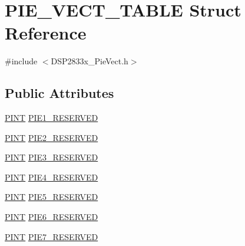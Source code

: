 \hypertarget{struct_p_i_e___v_e_c_t___t_a_b_l_e}{}\section{P\+I\+E\+\_\+\+V\+E\+C\+T\+\_\+\+T\+A\+B\+L\+E Struct Reference}
\label{struct_p_i_e___v_e_c_t___t_a_b_l_e}


{\ttfamily \#include $<$D\+S\+P2833x\+\_\+\+Pie\+Vect.\+h$>$}

\subsection*{Public Attributes}
\begin{DoxyCompactItemize}
\item 
\hyperlink{_d_s_p2833x___pie_vect_8h_ac2d9a96f68c695b560ad7d1322ad84b5}{P\+I\+N\+T} \hyperlink{struct_p_i_e___v_e_c_t___t_a_b_l_e_a99d8f42061323e647c8bbf95e43742e3}{P\+I\+E1\+\_\+\+R\+E\+S\+E\+R\+V\+E\+D}
\item 
\hyperlink{_d_s_p2833x___pie_vect_8h_ac2d9a96f68c695b560ad7d1322ad84b5}{P\+I\+N\+T} \hyperlink{struct_p_i_e___v_e_c_t___t_a_b_l_e_ac9575229b1b7ab91cfded48edbdf9b97}{P\+I\+E2\+\_\+\+R\+E\+S\+E\+R\+V\+E\+D}
\item 
\hyperlink{_d_s_p2833x___pie_vect_8h_ac2d9a96f68c695b560ad7d1322ad84b5}{P\+I\+N\+T} \hyperlink{struct_p_i_e___v_e_c_t___t_a_b_l_e_a432e44f671a793ae755c483f9f969168}{P\+I\+E3\+\_\+\+R\+E\+S\+E\+R\+V\+E\+D}
\item 
\hyperlink{_d_s_p2833x___pie_vect_8h_ac2d9a96f68c695b560ad7d1322ad84b5}{P\+I\+N\+T} \hyperlink{struct_p_i_e___v_e_c_t___t_a_b_l_e_a904cf1b50410fd849c9967f4c542cf88}{P\+I\+E4\+\_\+\+R\+E\+S\+E\+R\+V\+E\+D}
\item 
\hyperlink{_d_s_p2833x___pie_vect_8h_ac2d9a96f68c695b560ad7d1322ad84b5}{P\+I\+N\+T} \hyperlink{struct_p_i_e___v_e_c_t___t_a_b_l_e_a262c9f6963dfc62b00c3584c85694fbb}{P\+I\+E5\+\_\+\+R\+E\+S\+E\+R\+V\+E\+D}
\item 
\hyperlink{_d_s_p2833x___pie_vect_8h_ac2d9a96f68c695b560ad7d1322ad84b5}{P\+I\+N\+T} \hyperlink{struct_p_i_e___v_e_c_t___t_a_b_l_e_aa8dbfbadedced057110de3bcb203c6e3}{P\+I\+E6\+\_\+\+R\+E\+S\+E\+R\+V\+E\+D}
\item 
\hyperlink{_d_s_p2833x___pie_vect_8h_ac2d9a96f68c695b560ad7d1322ad84b5}{P\+I\+N\+T} \hyperlink{struct_p_i_e___v_e_c_t___t_a_b_l_e_a22bead8189ec5490a90e2e569e84c79a}{P\+I\+E7\+\_\+\+R\+E\+S\+E\+R\+V\+E\+D}
\item 

\end{DoxyCompactItemize}

